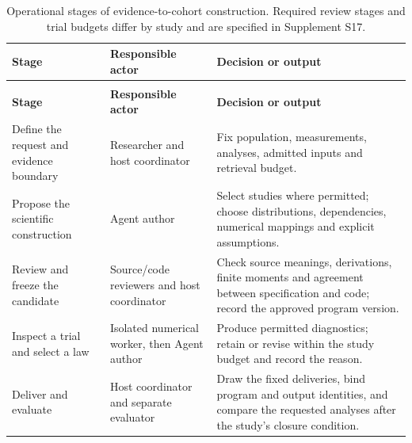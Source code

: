 \documentclass[11pt,letterpaper]{article}
\begin{document}
\begin{xltabular}{\linewidth}{@{}>{\raggedright\arraybackslash}X>{\raggedright\arraybackslash}X>{\raggedright\arraybackslash}X@{}}

\caption{Operational stages of evidence-to-cohort construction. Required review stages and trial budgets differ by study and are specified in Supplement S17.}\label{tab:1} \\

\toprule

\textbf{Stage} & \textbf{Responsible actor} & \textbf{Decision or output} \\

\midrule

\endfirsthead

\\

\toprule

\textbf{Stage} & \textbf{Responsible actor} & \textbf{Decision or output} \\

\midrule

\endhead

\bottomrule

\endfoot

Define the request and evidence boundary & Researcher and host coordinator & Fix population, measurements, analyses, admitted inputs and retrieval budget. \\

Propose the scientific construction & Agent author & Select studies where permitted; choose distributions, dependencies, numerical mappings and explicit assumptions. \\

Review and freeze the candidate & Source/\allowbreak{}code reviewers and host coordinator & Check source meanings, derivations, finite moments and agreement between specification and code; record the approved program version. \\

Inspect a trial and select a law & Isolated numerical worker, then Agent author & Produce permitted diagnostics; retain or revise within the study budget and record the reason. \\

Deliver and evaluate & Host coordinator and separate evaluator & Draw the fixed deliveries, bind program and output identities, and compare the requested analyses after the study's closure condition. \\

\end{xltabular}
\end{document}
